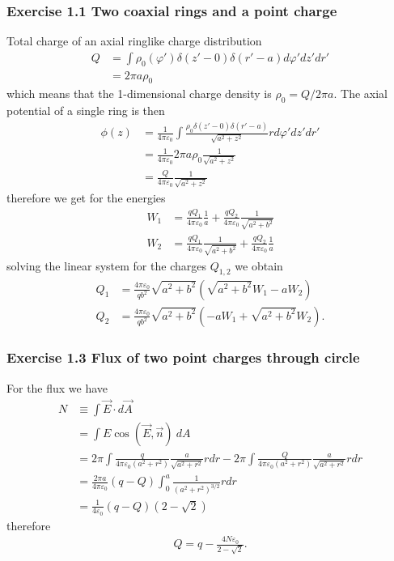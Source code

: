 \documentclass[10pt,a4paper]{book}
\theoremstyle{definition}
\begin{document}
\subsubsection{Exercise 1.1 Two coaxial rings and a point charge}
Total charge of an axial ringlike charge distribution
\begin{align}
    Q&=\int \rho_0(\varphi')\delta(z'-0)\delta(r'-a) d\varphi' dz' dr'\\
    &=2\pi a\rho_0
\end{align}
which means that the 1-dimensional charge density is $\rho_0=Q/2\pi a$.
The axial potential of a single ring is then
\begin{align}
    \phi(z)&=\frac{1}{4\pi\varepsilon_0}\int\frac{\rho_0\delta(z'-0)\delta(r'-a)}{\sqrt{a^2+z^2}}r d\varphi' dz' dr'\\
    &=\frac{1}{4\pi\varepsilon_0}2\pi a \rho_0\frac{1}{\sqrt{a^2+z^2}}\\
    &=\frac{Q}{4\pi\varepsilon_0}\frac{1}{\sqrt{a^2+z^2}}
\end{align}
therefore we get for the energies
\begin{align}
    W_1&=\frac{qQ_1}{4\pi\varepsilon_0}\frac{1}{a}+\frac{qQ_2}{4\pi\varepsilon_0}\frac{1}{\sqrt{a^2+b^2}}\\
    W_2&=\frac{qQ_1}{4\pi\varepsilon_0}\frac{1}{\sqrt{a^2+b^2}}+\frac{qQ_2}{4\pi\varepsilon_0}\frac{1}{a}
\end{align}
solving the linear system for the charges $Q_{1,2}$ we obtain
\begin{align}
    Q_1&=\frac{4\pi\varepsilon_0}{qb^2}\sqrt{a^2+b^2}\left(\sqrt{a^2+b^2}W_1-aW_2\right)\\
    Q_2&=\frac{4\pi\varepsilon_0}{qb^2}\sqrt{a^2+b^2}\left(-aW_1+\sqrt{a^2+b^2}W_2\right).
\end{align}

\subsubsection{Exercise 1.3 Flux of two point charges through circle}
For the flux we have
\begin{align}
    N&\equiv\int\vec{E}\cdot d\vec{A}\\
    &=\int E \cos(\vec{E},\vec{n})\ dA\\
    &=2\pi\int\frac{q}{4\pi\varepsilon_0(a^2+r^2)}\frac{a}{\sqrt{a^2+r^2}}rdr-2\pi\int\frac{Q}{4\pi\varepsilon_0(a^2+r^2)}\frac{a}{\sqrt{a^2+r^2}}rdr\\
    &=\frac{2\pi a}{4\pi\varepsilon_0}(q-Q)\int_0^a\frac{1}{(a^2+r^2)^{3/2}}rdr\\
    &=\frac{1}{4\varepsilon_0}(q-Q)\left(2-\sqrt{2}\right)
\end{align}
therefore
\begin{align}
    Q=q-\frac{4N\varepsilon_0}{2-\sqrt{2}}.
\end{align}
\end{document}
